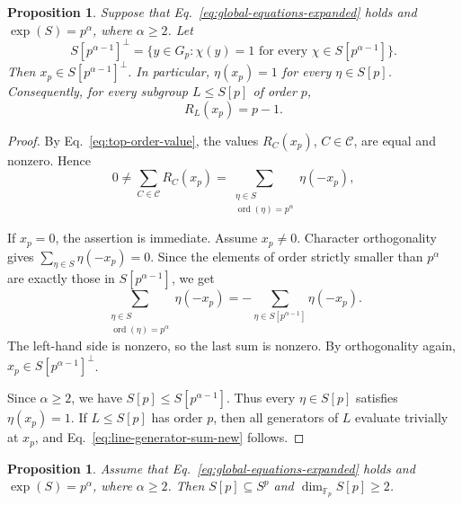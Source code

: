 \documentclass[11pt]{article}
\newtheorem{proposition}[theorem]{Proposition}
\theoremstyle{definition}
\DeclareMathOperator{\ord}{ord}
\begin{document}
\begin{proposition}\label{prop:top-order-annihilation}
	Suppose that Eq.~\eqref{eq:global-equations-expanded} holds and \(\exp(S)=p^\alpha\), where \(\alpha\ge2\). Let
	\[
	S[p^{\alpha-1}]^\perp=\{y\in G_p:\chi(y)=1\text{ for every }\chi\in S[p^{\alpha-1}]\}.
	\]
	Then \(x_p\in S[p^{\alpha-1}]^\perp\). In particular, \(\eta(x_p)=1\) for every \(\eta\in S[p]\). Consequently, for every subgroup \(L\le S[p]\) of order \(p\),
	\begin{equation}\label{eq:line-generator-sum-new}
	R_L(x_p)=p-1.
	\end{equation}
\end{proposition}

\begin{proof}
	By Eq.~\eqref{eq:top-order-value}, the values \(R_C(x_p)\), \(C\in\mathcal C\),
	are equal and nonzero.  Hence
	\[
	0\ne \sum_{C\in\mathcal C}R_C(x_p)
	=
	\sum_{\substack{\eta\in S\\ \ord(\eta)=p^\alpha}}\eta(-x_p),
	\]

	
	If \(x_p=0\), the assertion is immediate.  Assume \(x_p\ne 0\).  Character
	orthogonality gives \(\sum_{\eta\in S}\eta(-x_p)=0\).  Since the elements of
	order strictly smaller than \(p^\alpha\) are exactly those in
	\(S[p^{\alpha-1}]\), we get
	\[
	\sum_{\substack{\eta\in S\\ \ord(\eta)=p^\alpha}}\eta(-x_p)
	=
	-\sum_{\eta\in S[p^{\alpha-1}]}\eta(-x_p).
	\]
	The left-hand side is nonzero, so the last sum is nonzero.  By orthogonality
	again, \(x_p\in S[p^{\alpha-1}]^\perp\).
	
	Since \(\alpha\ge2\), we have \(S[p]\le S[p^{\alpha-1}]\).  Thus every
	\(\eta\in S[p]\) satisfies \(\eta(x_p)=1\).  If \(L\le S[p]\) has order
	\(p\), then all generators of \(L\) evaluate trivially at \(x_p\), and
	Eq.~\eqref{eq:line-generator-sum-new} follows.
\end{proof}




\begin{proposition}\label{prop:torsion-contained-in-pS}
	Assume that Eq.~\eqref{eq:global-equations-expanded} holds and \(\exp(S)=p^\alpha\), where \(\alpha\ge2\). Then \(S[p]\subseteq S^p\) and \(\dim_{\mathbb F_p}S[p]\ge2\).
\end{proposition}
\end{document}

